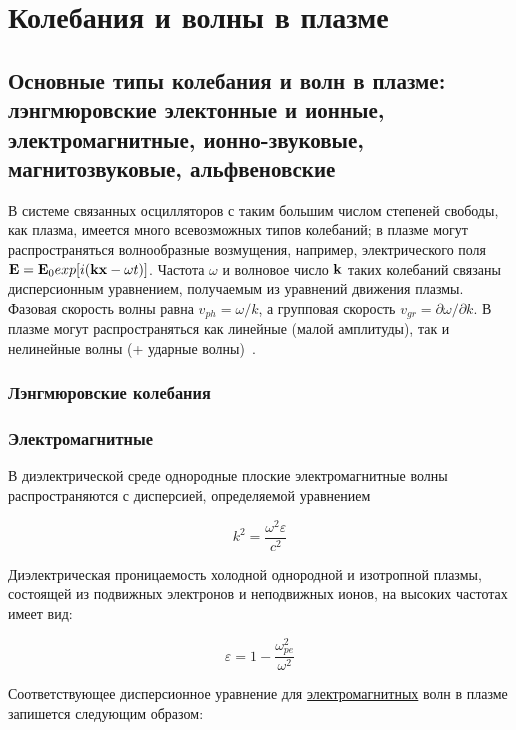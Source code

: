 \documentclass[10pt, a4paper]{article}
\let\stdsection\section
\renewcommand\section{\newpage\stdsection}
\begin{document}
\section{Колебания и волны в плазме}

\subsection{Основные типы колебания и волн в плазме: лэнгмюровские электонные и ионные, электромагнитные, ионно-звуковые, магнитозвуковые, альфвеновские}

В системе связанных осцилляторов с таким большим числом степеней свободы, как плазма, имеется много всевозможных типов колебаний; в плазме могут распространяться волнообразные возмущения, например, электрического поля $\vb{E}=\vb{E}_0exp[i(\vb{k}\vb{x}-\omega t)]$. Частота $\omega$ и волновое число $\vb{k}$ таких колебаний связаны дисперсионным уравнением, получаемым из уравнений движения плазмы. Фазовая скорость волны равна $v_{ph}=\omega/k$, а групповая скорость $v_{gr}=\partial\omega/\partial k$. В плазме могут распространяться как линейные (малой амплитуды), так и нелинейные волны (+ ударные волны)~\cite{kroll}.

\subsubsection{Лэнгмюровские колебания}



\subsubsection{Электромагнитные}

В диэлектрической среде однородные плоские электромагнитные волны распространяются с дисперсией, определяемой уравнением 

\begin{equation*}
	k^2=\frac{\omega^2\varepsilon}{c^2}
\end{equation*}

Диэлектрическая проницаемость холодной однородной и изотропной плазмы, состоящей из подвижных электронов и неподвижных ионов, на высоких частотах имеет вид:

\begin{equation*}
	\varepsilon = 1-\frac{\omega_{pe}^2}{\omega^2}
\end{equation*}

Соответствующее дисперсионное уравнение для \uline{электромагнитных} волн в плазме запишется следующим образом:
\end{document}
